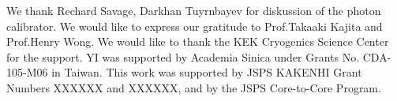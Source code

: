 \documentclass[]{spie}  %
\begin{document}
We thank Rechard Savage, Darkhan Tuyrnbayev for diskussion of the photon calibrator. We would like to express our gratitude to Prof.Takaaki Kajita and Prof.Henry Wong. We would like to thank the KEK Cryogenics Science Center for the support. YI was supported by Academia Sinica under Grants No. CDA-105-M06 in Taiwan. This work was supported by JSPS KAKENHI Grant Numbers XXXXXX and XXXXXX, and by the JSPS Core-to-Core Program.


\end{document}
